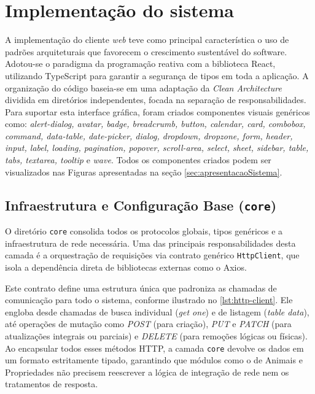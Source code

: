 \section{Implementação do sistema}\label{sec:implementacaoSistema}

A implementação do cliente \textit{web} teve como principal característica o uso de padrões arquiteturais que favorecem o crescimento sustentável do software. Adotou-se o paradigma da programação reativa com a biblioteca React, utilizando TypeScript para garantir a segurança de tipos em toda a aplicação. A organização do código baseia-se em uma adaptação da \textit{Clean Architecture} dividida em diretórios independentes, focada na separação de responsabilidades. Para suportar esta interface gráfica, foram criados componentes visuais genéricos como: \textit{alert-dialog, avatar, badge, breadcrumb, button, calendar, card, combobox, command, data-table, date-picker, dialog, dropdown, dropzone, form, header, input, label, loading, pagination, popover, scroll-area, select, sheet, sidebar, table, tabs, textarea, tooltip} e \textit{wave}. Todos os componentes criados podem ser visualizados nas Figuras apresentadas na seção \autoref{sec:apresentacaoSistema}.

\subsection{Infraestrutura e Configuração Base (\texttt{core})}\label{subsec:arquiteturaCore}

O diretório \texttt{core} consolida todos os protocolos globais, tipos genéricos e a infraestrutura de rede necessária. Uma das principais responsabilidades desta camada é a orquestração de requisições via contrato genérico \texttt{HttpClient}, que isola a dependência direta de bibliotecas externas como o Axios. 

Este contrato define uma estrutura única que padroniza as chamadas de comunicação para todo o sistema, conforme ilustrado no \autoref{lst:http-client}. Ele engloba desde chamadas de busca individual (\textit{get one}) e de listagem (\textit{table data}), até operações de mutação como \textit{POST} (para criação), \textit{PUT} e \textit{PATCH} (para atualizações integrais ou parciais) e \textit{DELETE} (para remoções lógicas ou físicas). Ao encapsular todos esses métodos \gls{HTTP}, a camada \texttt{core} devolve os dados em um formato estritamente tipado, garantindo que módulos como o de Animais e Propriedades não precisem reescrever a lógica de integração de rede nem os tratamentos de resposta.

